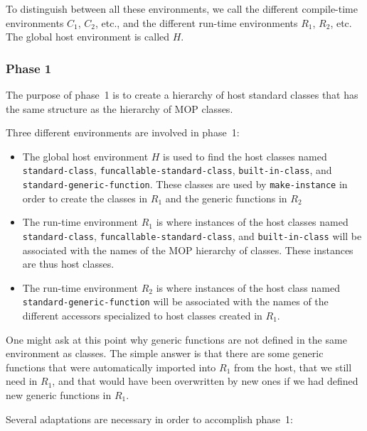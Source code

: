 To distinguish between all these environments, we call the different
compile-time environments $C_1$, $C_2$, etc., and the different
run-time environments $R_1$, $R_2$, etc.  The global host environment
is called $H$.

\subsubsection{Phase 1}

The purpose of phase~1 is to create a hierarchy of host standard
classes that has the same structure as the hierarchy of MOP classes.

Three different environments are involved in phase~1:

\begin{itemize}
\item The global host environment $H$ is used to find the host classes
  named \texttt{standard-class}, \texttt{funcallable-standard-class},
  \texttt{built-in-class}, and \texttt{standard-generic-function}.
  These classes are used by \texttt{make-instance} in order to create
  the classes in $R_1$ and the generic functions in $R_2$
\item The run-time environment $R_1$ is where instances of the host
  classes named \texttt{standard-class},
  \texttt{funcallable-standard-class}, and \texttt{built-in-class}
  will be associated with the names of the MOP hierarchy of classes.
  These instances are thus host classes.
\item The run-time environment $R_2$ is where instances of the host
  class named \texttt{standard-generic-function} will be associated
  with the names of the different accessors specialized to host
  classes created in $R_1$.
\end{itemize}

One might ask at this point why generic functions are not defined in
the same environment as classes.  The simple answer is that there are
some generic functions that were automatically imported into $R_1$
from the host, that we still need in $R_1$, and that would have been
overwritten by new ones if we had defined new generic functions in
$R_1$.

Several adaptations are necessary in order to accomplish phase~1:

